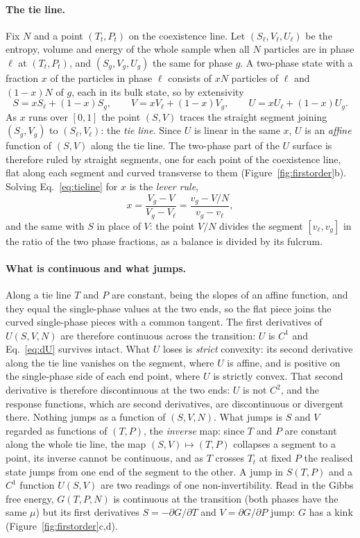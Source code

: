 \documentclass[10pt,a4paper]{article}
\theoremstyle{remark}
\begin{document}
\paragraph{The tie line.} Fix $N$ and a point $(T_t,P_t)$ on the coexistence
line. Let $(S_\ell,V_\ell,U_\ell)$ be the entropy, volume and energy of the
whole sample when all $N$ particles are in phase $\ell$ at $(T_t,P_t)$, and
$(S_g,V_g,U_g)$ the same for phase $g$. A two-phase state with a fraction $x$
of the particles in phase $\ell$ consists of $xN$ particles of $\ell$ and
$(1-x)N$ of $g$, each in its bulk state, so by extensivity
\begin{equation}\label{eq:tieline}
  S=xS_\ell+(1-x)S_g,\qquad V=xV_\ell+(1-x)V_g,\qquad U=xU_\ell+(1-x)U_g .
\end{equation}
As $x$ runs over $[0,1]$ the point $(S,V)$ traces the straight segment joining
$(S_g,V_g)$ to $(S_\ell,V_\ell)$: the \emph{tie line}. Since $U$ is linear in
the same $x$, $U$ is an \emph{affine} function of $(S,V)$ along the tie line.
The two-phase part of the $U$ surface is therefore ruled by straight segments,
one for each point of the coexistence line, flat along each segment and curved
transverse to them (Figure~\ref{fig:firstorder}b). Solving
Eq.~\eqref{eq:tieline} for $x$ is the \emph{lever rule},
\[
  x=\frac{V_g-V}{V_g-V_\ell}=\frac{v_g-V/N}{v_g-v_\ell} ,
\]
and the same with $S$ in place of $V$: the point $V/N$ divides the segment
$[v_\ell,v_g]$ in the ratio of the two phase fractions, as a balance is divided
by its fulcrum.

\paragraph{What is continuous and what jumps.} Along a tie line $T$ and $P$
are constant, being the slopes of an affine function, and they equal the
single-phase values at the two ends, so the flat piece joins the curved
single-phase pieces with a common tangent. The first derivatives of $U(S,V,N)$
are therefore continuous across the transition: $U$ is $C^{1}$ and
Eq.~\eqref{eq:dU} survives intact. What $U$ loses is \emph{strict} convexity:
its second derivative along the tie line vanishes on the segment, where $U$
is affine, and is positive on the single-phase side of each end point, where
$U$ is strictly convex. That second derivative is therefore discontinuous at
the two ends: $U$ is not $C^{2}$, and the response functions, which are second
derivatives, are discontinuous or divergent there. Nothing jumps as a function of $(S,V,N)$. What jumps is $S$ and $V$
regarded as functions of $(T,P)$, the \emph{inverse} map: since $T$ and $P$
are constant along the whole tie line, the map $(S,V)\mapsto(T,P)$ collapses a
segment to a point, its inverse cannot be continuous, and as $T$ crosses $T_t$
at fixed $P$ the realised state jumps from one end of the segment to the
other. A jump in $S(T,P)$ and a $C^{1}$ function $U(S,V)$ are two readings of
one non-invertibility. Read in the Gibbs free energy, $G(T,P,N)$ is continuous
at the transition (both phases have the same $\mu$) but its first derivatives
$S=-\partial G/\partial T$ and $V=\partial G/\partial P$ jump: $G$ has a kink
(Figure~\ref{fig:firstorder}c,d).
\end{document}
